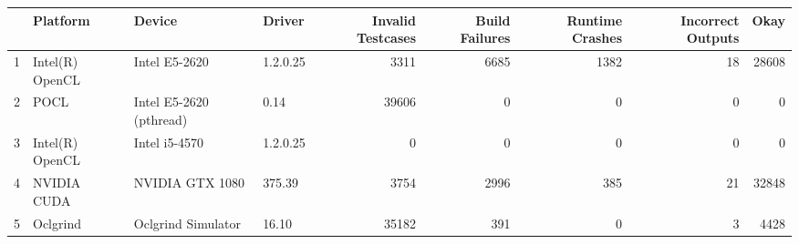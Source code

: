 \begin{tabular}{llllrrrrr}
\toprule
{} &         Platform &                   Device &    Driver &  Invalid Testcases &  Build Failures &  Runtime Crashes &  Incorrect Outputs &   Okay \\
\midrule
1 &  Intel(R) OpenCL &            Intel E5-2620 &  1.2.0.25 &               3311 &            6685 &             1382 &                 18 &  28608 \\
2 &             POCL &  Intel E5-2620 (pthread) &      0.14 &              39606 &               0 &                0 &                  0 &      0 \\
3 &  Intel(R) OpenCL &            Intel i5-4570 &  1.2.0.25 &                  0 &               0 &                0 &                  0 &      0 \\
4 &      NVIDIA CUDA &          NVIDIA GTX 1080 &    375.39 &               3754 &            2996 &              385 &                 21 &  32848 \\
5 &         Oclgrind &       Oclgrind Simulator &     16.10 &              35182 &             391 &                0 &                  3 &   4428 \\
\bottomrule
\end{tabular}
